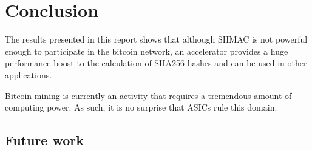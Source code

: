 \chapter{Conclusion}
\label{cha:conclusion}

The results presented in this report shows that although SHMAC is not powerful
enough to participate in the bitcoin network, an accelerator provides a huge
performance boost to the calculation of SHA256 hashes and can be used in other
applications.

Bitcoin mining is currently an activity that requires a tremendous amount of computing power.
As such, it is no surprise that ASICs rule this domain.

\section{Future work}